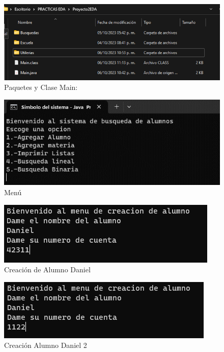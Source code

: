 \documentclass{report}
\begin{document}
\begin{figure}[h]
    \centering
    \includegraphics[width=1\linewidth]{Imagen3.png}
    \caption{Paquetes y Clase Main:}
  
\end{figure}
\begin{figure}[h]
    \centering
    \includegraphics[width=1\linewidth]{Imagen4.png}
    \caption{Menú}
\end{figure}
\begin{figure}[h]
    \centering
    \includegraphics[width=1\linewidth]{Imagen5.png}
    \caption{Creación de Alumno Daniel}

\end{figure}
\begin{figure}[h]
    \centering
    \includegraphics[width=1\linewidth]{Imagen6.png}
    \caption{Creación Alumno Daniel 2}
\end{figure}
\end{document}
